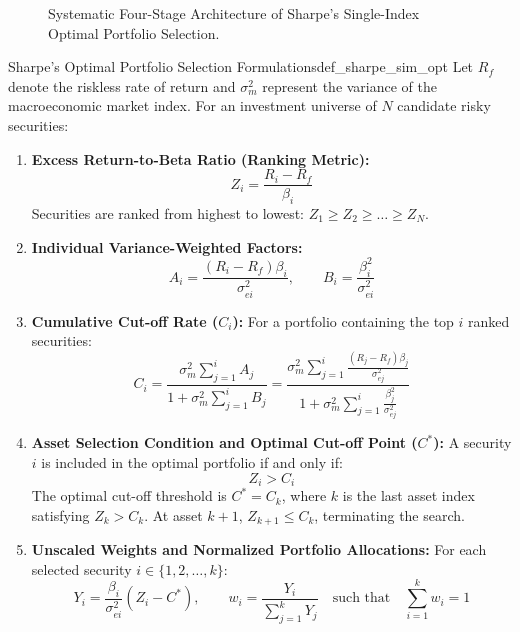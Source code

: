 \begin{figure}[H]
\caption{Systematic Four-Stage Architecture of Sharpe's Single-Index Optimal Portfolio Selection.}
\label{fig:sharpe_pipeline}
\end{figure}

\begin{definition}{Sharpe's Optimal Portfolio Selection Formulations}{def_sharpe_sim_opt}
Let $R_f$ denote the riskless rate of return and $\sigma_m^2$ represent the variance of the macroeconomic market index. For an investment universe of $N$ candidate risky securities:
\begin{enumerate}[leftmargin=*, topsep=2pt, itemsep=3pt]
    \item \textbf{Excess Return-to-Beta Ratio (Ranking Metric):}
    \begin{equation}
        Z_i = \frac{R_i - R_f}{\beta_i}
    \end{equation}
    Securities are ranked from highest to lowest: $Z_1 \ge Z_2 \ge \dots \ge Z_N$.

    \item \textbf{Individual Variance-Weighted Factors:}
    \begin{equation}
        A_i = \frac{(R_i - R_f)\beta_i}{\sigma_{ei}^2}, \qquad B_i = \frac{\beta_i^2}{\sigma_{ei}^2}
    \end{equation}

    \item \textbf{Cumulative Cut-off Rate ($C_i$):}
    For a portfolio containing the top $i$ ranked securities:
    \begin{equation}
        C_i = \frac{\sigma_m^2 \sum_{j=1}^i A_j}{1 + \sigma_m^2 \sum_{j=1}^i B_j} = \frac{\sigma_m^2 \sum_{j=1}^i \frac{(R_j - R_f)\beta_j}{\sigma_{ej}^2}}{1 + \sigma_m^2 \sum_{j=1}^i \frac{\beta_j^2}{\sigma_{ej}^2}}
    \end{equation}

    \item \textbf{Asset Selection Condition and Optimal Cut-off Point ($C^*$):}
    A security $i$ is included in the optimal portfolio if and only if:
    \begin{equation}
        Z_i > C_i
    \end{equation}
    The optimal cut-off threshold is $C^* = C_k$, where $k$ is the last asset index satisfying $Z_k > C_k$. At asset $k+1$, $Z_{k+1} \le C_k$, terminating the search.

    \item \textbf{Unscaled Weights and Normalized Portfolio Allocations:}
    For each selected security $i \in \{1, 2, \dots, k\}$:
    \begin{equation}
        Y_i = \frac{\beta_i}{\sigma_{ei}^2} (Z_i - C^*), \qquad w_i = \frac{Y_i}{\sum_{j=1}^k Y_j} \quad \text{such that} \quad \sum_{i=1}^k w_i = 1
    \end{equation}
\end{enumerate}
\end{definition}

